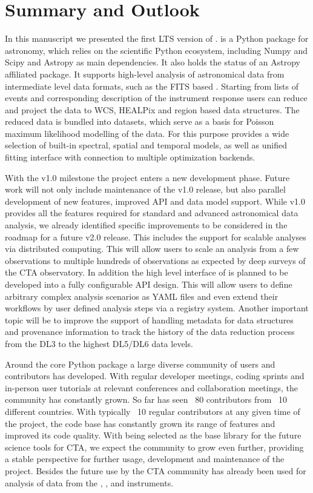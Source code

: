 \documentclass[traditabstract, longauth]{aa}
\begin{document}
\section{Summary and Outlook}
\label{sec:summary-and-outlook}
%
In this manuscript we presented the first LTS version of \gammapy.
\gammapy is a Python package for \gammaray astronomy, which relies on the
scientific Python ecosystem, including Numpy and Scipy and Astropy as
main dependencies. It also holds the status of an Astropy affiliated
package. It supports high-level analysis of astronomical \gammaray
data from intermediate level data formats, such as the FITS based
\gadf. Starting from lists of \gammaray events and corresponding description
of the instrument response users can reduce and project the data
to WCS, HEALPix and region based data structures. The reduced data is bundled
into datasets, which serve as a basis for Poisson maximum likelihood
modelling of the data. For this purpose \gammapy provides a wide selection
of built-in spectral, spatial and temporal models, as well as unified
fitting interface with connection to multiple optimization backends.

With the v1.0 milestone the \gammapy project enters a new development
phase. Future work will not only include maintenance of the v1.0 release,
but also parallel development of new features, improved API and data
model support. While v1.0 provides all the features required for
standard and advanced astronomical \gammaray data analysis,
we already identified specific improvements to be considered in the
roadmap for a future v2.0 release. This includes the support for
scalable analyses via distributed computing. This will allow
users to scale an analysis from a few observations to multiple
hundreds of observations as expected by deep surveys of the CTA
observatory. In addition the high level interface
of \gammapy is planned to be developed into a fully configurable
API design. This will allow users to define arbitrary complex analysis
scenarios as YAML files and even extend their workflows by user defined
analysis steps via a registry system. Another important topic will
be to improve the support of handling metadata for data structures
and provenance information to track the history of the data reduction
process from the DL3 to the highest DL5/DL6 data levels.

Around the core Python package a large diverse community of
users and contributors has developed. With regular developer meetings,
coding sprints and in-person user tutorials at relevant conferences
and collaboration meetings, the community has constantly grown.
So far \gammapy has seen ~80 contributors from ~10 different countries.
With typically ~10 regular contributors at any given time of the
project, the code base has constantly grown its range of features
and improved its code quality. With \gammapy being selected as the base library
for the future science tools for CTA, we expect the community to grow
even further, providing a stable perspective for further usage,
development and maintenance of the project. Besides the future use
by the CTA community \gammapy has already
been used for analysis of data from the \hess, \magic
\hawc, \astri and \veritas instruments.
\end{document}
